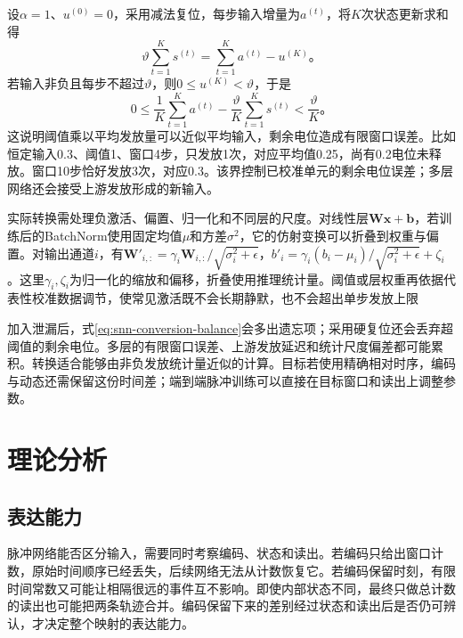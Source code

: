 设$\alpha=1$、$u^{(0)}=0$，采用减法复位，每步输入增量为$a^{(t)}$，将$K$次状态更新求和得
\begin{equation}
  \vartheta\sum_{t=1}^{K}s^{(t)}
  =\sum_{t=1}^{K}a^{(t)}-u^{(K)}\text{。}
  \label{eq:snn-conversion-balance}
\end{equation}
若输入非负且每步不超过$\vartheta$，则$0\leq u^{(K)}<\vartheta$，于是
\begin{equation}
  0\leq\frac1K\sum_{t=1}^{K}a^{(t)}
       -\frac{\vartheta}{K}\sum_{t=1}^{K}s^{(t)}
  <\frac{\vartheta}{K}\text{。}
  \label{eq:snn-conversion-error}
\end{equation}
这说明阈值乘以平均发放量可以近似平均输入，剩余电位造成有限窗口误差。比如恒定输入0.3、阈值1、窗口4步，只发放1次，对应平均值0.25，尚有0.2电位未释放。窗口10步恰好发放3次，对应0.3。该界控制已校准单元的剩余电位误差；多层网络还会接受上游发放形成的新输入。

实际转换需处理负激活、偏置、归一化和不同层的尺度。对线性层$\bm W\bm x+\bm b$，若训练后的BatchNorm使用固定均值$\mu$和方差$\sigma^2$，它的仿射变换可以折叠到权重与偏置。对输出通道$i$，有$\bm W'_{i,:}=\gamma_i\bm W_{i,:}/\sqrt{\sigma_i^2+\epsilon}$，$b'_i=\gamma_i(b_i-\mu_i)/\sqrt{\sigma_i^2+\epsilon}+\zeta_i$。这里$\gamma_i,\zeta_i$为归一化的缩放和偏移，折叠使用推理统计量。阈值或层权重再依据代表性校准数据调节，使常见激活既不会长期静默，也不会超出单步发放上限

加入泄漏后，式\eqref{eq:snn-conversion-balance}会多出遗忘项；采用硬复位还会丢弃超阈值的剩余电位。多层的有限窗口误差、上游发放延迟和统计尺度偏差都可能累积。转换适合能够由非负发放统计量近似的计算。目标若使用精确相对时序，编码与动态还需保留这份时间差；端到端脉冲训练可以直接在目标窗口和读出上调整参数。

\section{理论分析}
\label{sec:snn-analysis}

\subsection{表达能力}
\label{sec:snn-temporal-stability}

脉冲网络能否区分输入，需要同时考察编码、状态和读出。若编码只给出窗口计数，原始时间顺序已经丢失，后续网络无法从计数恢复它。若编码保留时刻，有限时间常数又可能让相隔很远的事件互不影响。即使内部状态不同，最终只做总计数的读出也可能把两条轨迹合并。编码保留下来的差别经过状态和读出后是否仍可辨认，才决定整个映射的表达能力。

